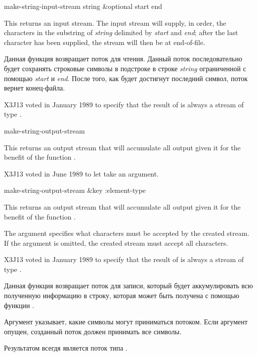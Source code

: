 \begin{defun}[Function]
make-string-input-stream string &optional start end

This returns an input stream.
The input stream will supply, in order, the characters in the substring
of \emph{string} delimited by \emph{start} and \emph{end}; after the last
character has been supplied, the stream will then be at end-of-file.

Данная функция возвращает поток для чтения.
Данный поток последовательно будет сохранять строковые символы в подстроке в
строке \emph{string} ограниченной с помощью \emph{start} и \emph{end}. После
того, как будет достигнут последний символ, поток вернет конец-файла.

\begin{new}
X3J13 voted in January 1989
to specify that the result of
 is always a stream of type .
\end{new}
\end{defun}

\begin{obsolete}
\begin{defun}[Function]
make-string-output-stream 

This returns an output stream that will 
accumulate all output given it for the benefit of the function
.
\end{defun}
\end{obsolete}

\begin{newer}
X3J13 voted in June 1989 
to let  take an  argument.

\begin{defun}[Function]
make-string-output-stream &key :element-type

This returns an output stream that will 
accumulate all output given it for the benefit of the function
.

The  argument specifies what characters
must be accepted by the created stream.  If the  argument
is omitted, the created stream must accept all characters.

X3J13 voted in January 1989
to specify that the result of
 is always a stream of type .

Данная функция возвращает поток для записи, который будет аккумулировать всю
полученную информацию в строку, которая может быть получена с помощью функции
.

Аргумент  указывает, какие символы могут приниматься
потоком. Если аргумент  опущен, созданный поток должен
принимать все символы.

Результатом  всегдя является поток типа
.
\end{defun}
\end{newer}


